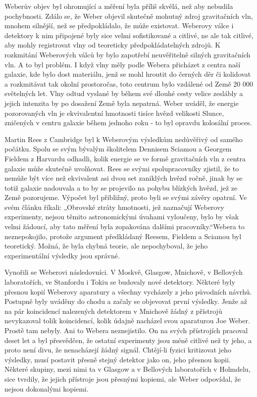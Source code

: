   Weberův objev byl ohromující a měření byla příliš skvělá, než aby nebudila pochybnosti. Zdálo se,
  že Weber objevil skutečně mohutný zdroj gravitačních vln, mnohem silnější, než se předpokládalo,
  že může existovat. Weberovy válce i detektory k nim připojené byly sice velmi sofistikované a
  citlivé, ne ale tak citlivé, aby mohly registrovat vlny od teoreticky předpokládatelných zdrojů. K
  rozkmitání Weberových válců by bylo zapotřebí neuvěřitelně silných gravitačních vln. A to byl
  problém. I když vlny měly podle Webera přicházet z centra naší galaxie, kde bylo dost materiálu,
  jenž se mohl hroutit do černých děr či kolidovat a rozkmitávat tak okolní prostoročas, toto
  centrum bylo vzdálené od Země 20 000 světelných let. Vlny odtud vyslané by během své dlouhé cesty
  velice zeslábly a jejich intenzita by po dosažení Země byla nepatrná. Weber uváděl, že energie
  pozorovaných vln je ekvivalentní hmotnosti tisíce hvězd velikosti Slunce, zničených v centru
  galaxie během jednoho roku - to byl opravdu kolosální proces. 

  Martin Rees z Cambridge byl k Weberovým výsledkům nedůvěřivý od samého počátku. Spolu se svým
  bývalým školitelem Dennisem Sciamou a Georgem Fieldem z Harvardu odhadli, kolik energie se ve
  formě gravitačních vln z centra galaxie může skutečně uvolňovat. Rees se svými spolupracovníky
  zjistil, že to nemůže být více než ekvivalent asi dvou set zaniklých hvězd ročně, jinak by se
  totiž galaxie nadouvala a to by se projevilo na pohybu blízkých hvězd, jež ze Země pozorujeme.
  Výpočet byl přibližný, proto byli se svými závěry opatrní. Ve svém článku říkali: „Obrovské ztráty
  hmotnosti, jež naznačují Weberovy experimenty, nejsou těmito astronomickými úvahami vyloučeny,
  bylo by však velmi žádoucí, aby tato měření byla zopakována dalšími pracovníky.“Webera to
  neznepokojilo, protože argument předkládaný Reesem, Fieldem a Sciamou byl teoretický. Možná, že
  byla chybná teorie, ale nepochyboval, že jeho experimentální výsledky jsou správné.

  Vynořili se Weberovi následovníci. V Moskvě, Glasgow, Mnichově, v Bellových laboratořích, ve
  Stanfordu i Tokiu se budovaly nové detektory. Některé byly přesnou kopií Weberovy aparatury a
  všechny vycházely z jeho původních návrhů. Postupně byly uváděny do chodu a začaly se objevovat
  první výsledky. Jenže až na pár koincidencí nalezených detektorem v Mnichově žádný z přístrojů
  nevykazoval tolik koincidencí, kolik údajně nacházel svou aparaturou Joe Weber. Prostě tam nebyly.
  Ani to Webera neznejistilo. On na svých přístrojích pracoval deset let a byl přesvědčen, že
  ostatní experimenty jsou méně citlivé než ty jeho, a proto není divu, že nenacházejí žádný signál.
  Chtějí-li fyzici kritizovat jeho výsledky, musí postavit přesně stejný detektor jako on, jeho
  přesnou kopii. Některé skupiny, mezi nimi ta v Glasgow a v Bellových laboratořích v Holmdelu, sice
  tvrdily, že jejich přístroje jsou přesnými kopiemi, ale Weber odpovídal, že nejsou dokonalými
  kopiemi. 

